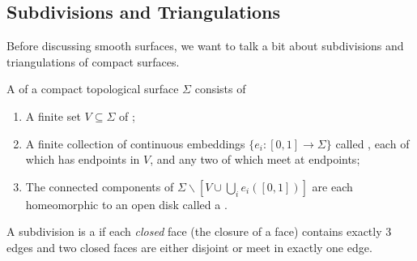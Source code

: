 \subsection{Subdivisions and Triangulations}

Before discussing smooth surfaces, we want to talk a bit about subdivisions and triangulations of compact surfaces.

\begin{definition}[Subdivision]
    A  of a compact topological surface $\Sigma$ consists of 
    \begin{enumerate}[label=(\roman*)]
        \item A finite set $V \subseteq \Sigma$ of ;
        \item A finite collection of continuous embeddings $\{e_i : [0, 1] \rightarrow \Sigma\}$ called , each of which has endpoints in $V$, and any two of which meet at endpoints;
        \item The connected components of $\Sigma \backslash \left[V \cup \bigcup_i e_i([0, 1])\right]$ are each homeomorphic to an open disk called a .
    \end{enumerate}
\end{definition}

\begin{definition}[Triangulation]
    A subdivision is a  if each \emph{closed} face (the closure of a face) contains exactly 3 edges and two closed faces are either disjoint or meet in exactly one edge.    
\end{definition}

